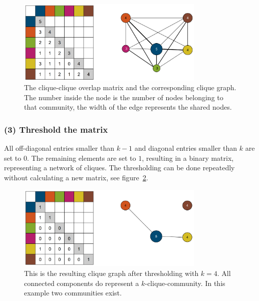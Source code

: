 \documentclass[runningheads,a4paper]{llncs}
\begin{document}
\begin{figure}
\begin{center}
	\includegraphics[width=0.8\textwidth]{img/matrix.png}
		\caption{The clique-clique overlap matrix and the corresponding clique graph. The number inside the node is the number of nodes belonging to that community, the width of the edge represents the shared nodes.}
		\label{fig:matrix}
\end{center}		
\end{figure}


\subsubsection{(3) Threshold the matrix}
All off-diagonal entries smaller than $k-1$ and diagonal entries smaller than $k$ are set to $0$.
The remaining elements are set to $1$, resulting in a binary matrix, representing a network of cliques. The thresholding can be done repeatedly without calculating a new matrix, see figure~\ref{fig:matrixtrashed}.

\begin{figure}
\begin{center}
	\includegraphics[width=0.8\textwidth]{img/matrixtrashed}
		\caption{This is the resulting clique graph after thresholding with $k=4$. All connected components do represent a $k$-clique-community. In this example two communities exist.}
		\label{fig:matrixtrashed}
\end{center}
\end{figure}
 
\end{document}
